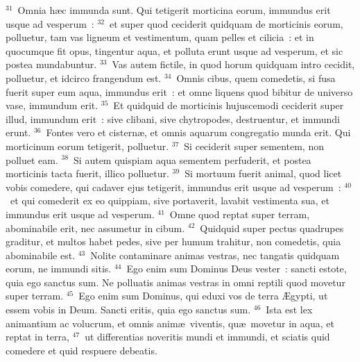 ${}^{31}$~Omnia h\ae c immunda sunt. Qui tetigerit morticina eorum, immundus erit usque ad vesperum~:
${}^{32}$~et super quod ceciderit quidquam de morticinis eorum, polluetur, tam vas ligneum et vestimentum, quam pelles et cilicia~: et in quocumque fit opus, tingentur aqua, et polluta erunt usque ad vesperum, et sic postea mundabuntur.
${}^{33}$~Vas autem fictile, in quod horum quidquam intro cecidit, polluetur, et idcirco frangendum est.
${}^{34}$~Omnis cibus, quem comedetis, si fusa fuerit super eum aqua, immundus erit~: et omne liquens quod bibitur de universo vase, immundum erit.
${}^{35}$~Et quidquid de morticinis hujuscemodi ceciderit super illud, immundum erit~: sive clibani, sive chytropodes, destruentur, et immundi erunt.
${}^{36}$~Fontes vero et cistern\ae , et omnis aquarum congregatio munda erit. Qui morticinum eorum tetigerit, polluetur.
${}^{37}$~Si ceciderit super sementem, non polluet eam.
${}^{38}$~Si autem quispiam aqua sementem perfuderit, et postea morticinis tacta fuerit, illico polluetur.
${}^{39}$~Si mortuum fuerit animal, quod licet vobis comedere, qui cadaver ejus tetigerit, immundus erit usque ad vesperum~:
${}^{40}$~et qui comederit ex eo quippiam, sive portaverit, lavabit vestimenta sua, et immundus erit usque ad vesperum.
${}^{41}$~Omne quod reptat super terram, abominabile erit, nec assumetur in cibum.
${}^{42}$~Quidquid super pectus quadrupes graditur, et multos habet pedes, sive per humum trahitur, non comedetis, quia abominabile est.
${}^{43}$~Nolite contaminare animas vestras, nec tangatis quidquam eorum, ne immundi sitis.
${}^{44}$~Ego enim sum Dominus Deus vester~: sancti estote, quia ego sanctus sum. Ne polluatis animas vestras in omni reptili quod movetur super terram.
${}^{45}$~Ego enim sum Dominus, qui eduxi vos de terra \AE gypti, ut essem vobis in Deum. Sancti eritis, quia ego sanctus sum.
${}^{46}$~Ista est lex animantium ac volucrum, et omnis anim\ae\ viventis, qu\ae\ movetur in aqua, et reptat in terra,
${}^{47}$~ut differentias noveritis mundi et immundi, et sciatis quid comedere et quid respuere debeatis.

